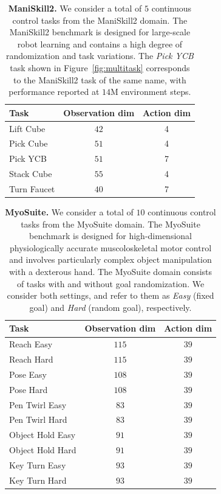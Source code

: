 \documentclass{article}
\begin{document}
\begin{table}[h!]
\centering
\parbox{\textwidth}{
\caption{\textbf{ManiSkill2.} We consider a total of $5$ continuous control tasks from the ManiSkill2 domain. The ManiSkill2 benchmark is designed for large-scale robot learning and contains a high degree of randomization and task variations. The \emph{Pick YCB} task shown in Figure~\ref{fig:multitask} corresponds to the ManiSkill2 task of the same name, with performance reported at $14$M environment steps.}
\label{tab:appendix-maniskill2-tasks}
\centering
\vspace{-0.05in}
\begin{tabular}{lcc}
\toprule
\textbf{Task} & \textbf{Observation dim} & \textbf{Action dim} \\ \midrule
Lift Cube & $42$ & 4 \\
Pick Cube & $51$ & 4 \\
Pick YCB & $51$ & 7 \\
Stack Cube & $55$ & 4 \\
Turn Faucet & $40$ & 7 \\ \bottomrule
\end{tabular}%
}
\vspace{-0.1in}
\end{table}

\begin{table}[h!]
\centering
\parbox{\textwidth}{
\caption{\textbf{MyoSuite.} We consider a total of $10$ continuous control tasks from the MyoSuite domain. The MyoSuite benchmark is designed for high-dimensional physiologically accurate muscoloskeletal motor control and involves particularly complex object manipulation with a dexterous hand. The MyoSuite domain consists of tasks with and without goal randomization. We consider both settings, and refer to them as \emph{Easy} (fixed goal) and \emph{Hard} (random goal), respectively.}
\label{tab:appendix-maniskill2-tasks}
\centering
\vspace{-0.05in}
\begin{tabular}{lcc}
\toprule
\textbf{Task} & \textbf{Observation dim} & \textbf{Action dim} \\ \midrule
Reach Easy & $115$ & $39$ \\
Reach Hard & $115$ & $39$ \\
Pose Easy & $108$ & $39$ \\
Pose Hard & $108$ & $39$ \\
Pen Twirl Easy & $83$ & $39$ \\
Pen Twirl Hard & $83$ & $39$ \\
Object Hold Easy & $91$ & $39$ \\
Object Hold Hard & $91$ & $39$ \\
Key Turn Easy & $93$ & $39$ \\
Key Turn Hard & $93$ & $39$ \\ \bottomrule
\end{tabular}%
}
\vspace{-0.1in}
\end{table}
\end{document}
